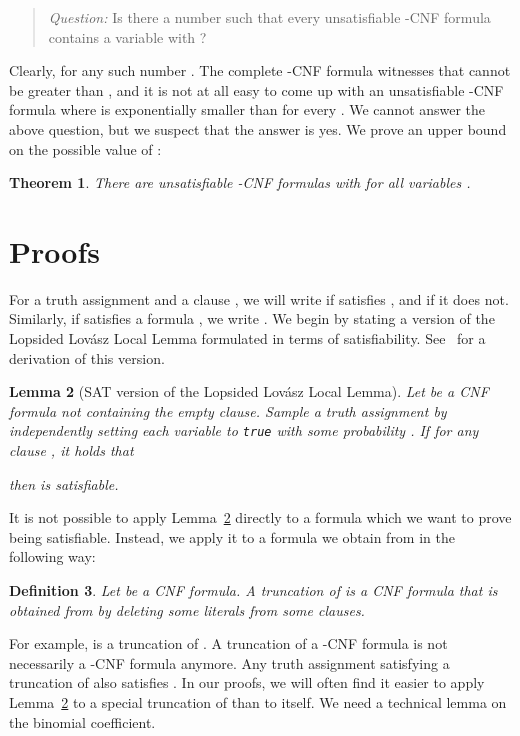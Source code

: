 \documentclass[a4paper, 11pt]{article}
\newtheorem{theorem}{Theorem}\newtheorem{proposition}[theorem]{Proposition}
\newtheorem{lemma}[theorem]{Lemma}
\newtheorem{definition}[theorem]{Definition}
\begin{document}
\begin{quotation}
  {\em Question:} Is there a number  such that every unsatisfiable
  -CNF formula contains a variable  with 
  ?
\end{quotation}

Clearly,  for any such number . The complete
-CNF formula witnesses that  cannot be greater than , and it
is not at all easy to come up with an unsatisfiable -CNF formula
where  is exponentially smaller than
 for every . We cannot answer the above question, but we
suspect that the answer is yes. We prove an upper bound on the
possible value of :

\begin{theorem}
  There are unsatisfiable -CNF formulas with  for all variables .
\label{theorem-individual}
\end{theorem}



\section{Proofs}\label{section-proofs}

For a truth assignment  and a clause , we will write
 if  satisfies , and  if it does not.  Similarly, if  satisfies a formula , we
write . We begin by stating a version of the
Lopsided Lov\'asz Local Lemma formulated in terms of satisfiability.
See~\cite{SZ2008} for a derivation of this version.

\begin{lemma}[SAT version of the Lopsided Lov\'asz Local Lemma]
  Let  be a CNF formula not containing the empty clause.  Sample a
  truth assignment  by independently setting each variable 
  to {\em \texttt{true}} with some probability .  If
  for any clause , it holds that
 
 then  is satisfiable.
\label{corollary-llll}
\end{lemma}

It is not possible to apply
Lemma~\ref{corollary-llll} directly to a formula  which we want to prove
being satisfiable. Instead, we apply it to a formula  we obtain
from  in the following way:

\begin{definition}
  Let  be a CNF formula. A {\em truncation} of  is a CNF formula
   that is obtained from  by deleting some literals from some
  clauses.
\end{definition}

For example,  is a truncation of
.  A
truncation of a -CNF formula is not necessarily a -CNF formula
anymore. Any truth assignment satisfying a truncation  of  also
satisfies . In our proofs, we will often find it easier to apply
Lemma~\ref{corollary-llll} to a special truncation of  than to 
itself. We need a technical lemma on the binomial coefficient.
 
\end{document}
